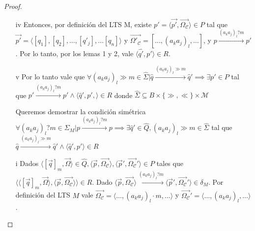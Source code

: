 \begin{proof}
\begin{itemize}
    \item[iv] Entonces, por definición del LTS M, existe $p'=\langle \overrightarrow{p'}, \overrightarrow{\Omega_\mathcal{C}} \rangle \in P$ tal que $\overrightarrow{p'}=\langle [q_1], [q_2], \ldots, [q'_j], \ldots [q_n] \rangle$ y $\overrightarrow{\Omega'_\mathcal{C}}=[\ldots, (a_ka_j)_l, \ldots]$, y $p \xrightarrow{(a_ka_j)_l?m} p'$. Por lo tanto, por los lemas 1 y 2, vale $\langle \hat{q'}, p' \rangle \in R$.
    
    
    \item[v] Por lo tanto vale que $\forall (a_ka_j)_l \gg m \in \hat{\Sigma} | \hat{q} \xrightarrow{(a_ka_j)_l \gg m} \hat{q}' \implies \exists p' \in P$ tal que $p' \xrightarrow{(a_ka_j)_l?m} p' \land \langle \hat{q}', p', \rangle \in R$ donde $\hat{\Sigma} \subseteq B \times \{\gg,\ll\} \times \mathcal{M}$
    
    \item[] Queremos demostrar la condición simétrica $\forall (a_ka_j)_l?m \in \Sigma_M | p \xrightarrow{(a_ka_j)_l?m} p \implies \exists \hat{q}' \in \hat{Q}, (a_ka_j)_l \gg m \in \hat{\Sigma}$ tal que $\hat{q} \xrightarrow{(a_ka_j)_l \gg m} \hat{q}' \land \langle \hat{q}', p'\rangle \in R$
    
    \item[i]Dados $\langle [\overrightarrow{q}]_m, \overrightarrow{\Omega} \rangle \in \hat{Q}, \langle \overrightarrow{p}, \overrightarrow{\Omega_\mathcal{C}} \rangle, \langle \overrightarrow{p}', \overrightarrow{\Omega_\mathcal{C}}' \rangle \in P$ tales que $\langle \langle [\overrightarrow{q}]_m, \overrightarrow{\Omega} \rangle, \langle \overrightarrow{p}, \overrightarrow{\Omega_\mathcal{C}} \rangle \rangle \in R$. Dado $\langle \overrightarrow{p}, \overrightarrow{\Omega_\mathcal{C}} \rangle \xrightarrow{(a_ka_j)_l?m} \langle \overrightarrow{p}', \overrightarrow{\Omega_\mathcal{C}}' \rangle \in \delta_M$. Por definición del LTS $M$ vale $\overrightarrow{\Omega_{\mathcal{C}}}= \langle \ldots,(a_ka_j)_l \cdot m, \ldots \rangle$ y $\overrightarrow{\Omega_{\mathcal{C}}}'= \langle \ldots,(a_ka_j)_l, \ldots \rangle$.
    

\end{itemize}
\end{proof}
